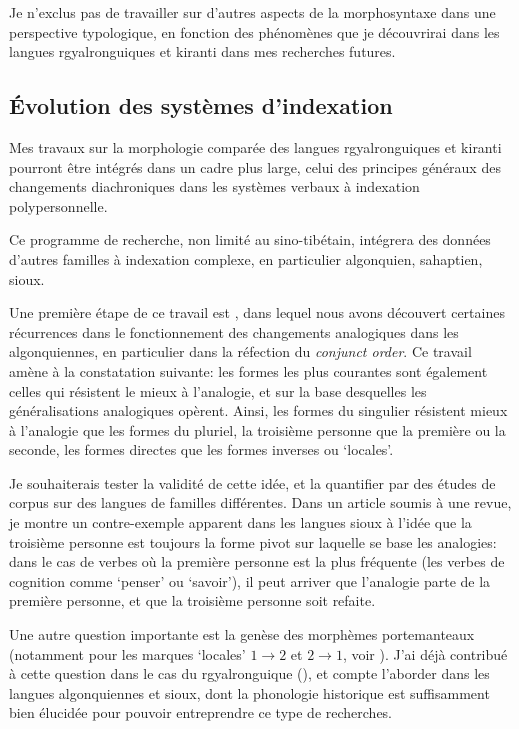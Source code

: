 \documentclass[oldfontcommands,oneside,a4paper,11pt]{article}
\begin{document}
Je n'exclus pas de travailler sur d'autres aspects de la morphosyntaxe dans une perspective typologique, en fonction des phénomènes que je découvrirai  dans les langues rgyalronguiques et kiranti dans mes recherches futures.

\subsection{Évolution des systèmes d'indexation} \label{sec:indexation}
 Mes travaux sur la morphologie comparée des langues rgyalronguiques et kiranti pourront être intégrés dans un cadre plus large, celui des principes généraux des changements diachroniques dans les systèmes verbaux à indexation polypersonnelle.  
 
 Ce programme de recherche, non limité au sino-tibétain, intégrera des données d'autres familles à indexation complexe, en particulier algonquien, sahaptien, sioux. 

Une première étape de ce travail est \citet{jacques15directionality}, dans lequel nous avons découvert certaines récurrences dans le fonctionnement des changements analogiques dans les algonquiennes, en particulier dans la réfection du \textit{conjunct order}. Ce travail amène à la constatation suivante:  les formes les plus courantes sont également celles qui résistent le mieux à l'analogie, et sur la base desquelles les généralisations analogiques opèrent. Ainsi, les formes du singulier résistent mieux à l'analogie que les formes du pluriel, la troisième personne que la première ou la seconde, les formes directes que les formes inverses ou `locales'.

Je souhaiterais tester la validité de cette idée, et la quantifier par des études de corpus sur des langues de familles différentes. Dans un article soumis à une revue, je montre un contre-exemple apparent dans les langues sioux à l'idée que la troisième personne est toujours la forme pivot sur laquelle se base les analogies: dans le cas de verbes où la première personne est la plus fréquente (les verbes de cognition comme `penser' ou `savoir'), il peut arriver que l'analogie parte de la première personne, et que la troisième personne soit refaite.
 
 Une autre question importante est la genèse des morphèmes portemanteaux  (notamment pour les marques `locales' $1\rightarrow2$ et $2\rightarrow1$, voir \citealt{heath98skewing}). J'ai déjà contribué à cette question dans le cas du rgyalronguique (\citealt{jacques15generic}), et compte l'aborder dans les langues algonquiennes et sioux, dont la phonologie historique est suffisamment bien élucidée pour pouvoir entreprendre ce type de recherches. 
 
\end{document}
